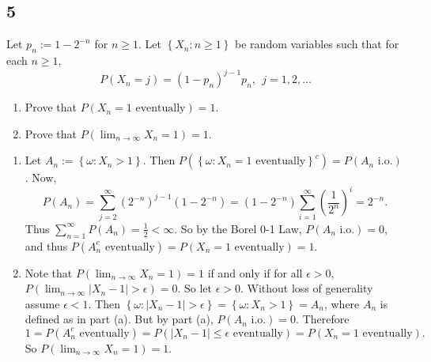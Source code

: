 \documentclass[12pt]{article}
\begin{document}
\subsection*{5}
\begin{tcolorbox}
Let $p_{n} := 1 - 2^{-n}$ for $n \geq 1$. Let $\left\{ X_{n} : n\geq 1 \right\}$ be random variables such that for each $n \geq 1$,
\[ P(X_{n} = j) = (1 - p_{n})^{j-1}p_{n}, \ \ j = 1, 2, \hdots \]
\begin{enumerate}[label=(\alph*)]
\item Prove that $P(X_{n} = 1 \text{ eventually}) = 1$.
\item Prove that $P(\lim_{n\rightarrow\infty} X_{n} = 1) = 1$.
\end{enumerate}
\end{tcolorbox}
\begin{enumerate}[label=(\alph*)]
\item Let $A_{n} := \left\{ \omega : X_{n} > 1 \right\}$. Then 
$P\left( \left\{ \omega : X_{n} = 1 \text{ eventually}\right\}^{c} \right) = P\left( A_{n} \text{ i.o.} \right)$. Now,
\[ P(A_{n}) = \sum_{j=2}^{\infty}(2^{-n})^{j-1}(1-2^{-n}) = (1-2^{-n})\sum_{i=1}^{\infty}\left( \frac{1}{2^{n}} \right)^{i} = 2^{-n}. \]
Thus $\sum_{n=1}^{\infty}P(A_{n}) = \frac{1}{2} < \infty$. So by the Borel 0-1 Law, $P(A_{n}\text{ i.o.}) = 0$, and thus 
$P(A_{n}^{c}\text{ eventually}) = P(X_{n} = 1 \text{ eventually}) = 1$.

\item Note that $P(\lim_{n\rightarrow\infty} X_{n} = 1) = 1$ if and only if for all $\epsilon > 0$, $P(\lim_{n\rightarrow\infty}|X_{n} - 1| > \epsilon) =
0$. So let $\epsilon > 0$. Without loss of generality assume $\epsilon < 1$. Then $\left\{ \omega : |X_{n} - 1| > \epsilon \right\} = \left\{ \omega : 
X_{n} > 1\right\} = A_{n}$, where $A_{n}$ is defined as in part (a). But by part (a), $P(A_{n} \text{ i.o.}) = 0$. Therefore 
\[1 =  P(A_{n}^{c}\text{ eventually}) = P(|X_{n} - 1 | \leq \epsilon \text{ eventually}) = P(X_{n} = 1 \text{ eventually}). \]
So $P(\lim_{n\rightarrow\infty}X_{n} = 1) = 1$.
\end{enumerate}
\end{document}
